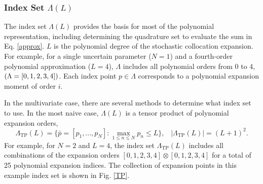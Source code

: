 \documentclass{mc2015}
\begin{document}
\subsubsection{Index Set $\Lambda(L)$}
The index set $\Lambda(L)$ provides the basis for most of the polynomial representation, including determining the quadrature set to evaluate the sum in Eq. \ref{approx}.  $L$ is the polynomial degree of the stochastic collocation expansion.  For example, for a single uncertain parameter ($N=1$) and a fourth-order polynomial approximation ($L=4$), $\Lambda$ includes all polynomial orders from 0 to 4, $\qty(\Lambda=[0,1,2,3,4])$.  Each index point $p\in\Lambda$ corresponds to a polynomial expansion moment of order $i$.

In the multivariate case, there are several methods to determine what index set to use.
In the most naive case, $\Lambda(L)$ is a tensor product of polynomial expansion orders,
\begin{equation}
\Lambda_\text{TP}(L)=\Big\{\bar p=[p_1,...,p_N]: \max_{1\leq n\leq N}p_n\leq L \Big\},\hspace{10pt}|\Lambda_\text{TP}(L)|=(L+1)^2.
\end{equation}
For example, for $N=2$ and $L=4$, the index set $\Lambda_\text{TP}(L)$ includes all combinations of the expansion orders $[0,1,2,3,4]\otimes[0,1,2,3,4]$ for a total of 25 polynomial expansion indices.  The collection of expansion points in this example index set is shown in Fig. \ref{TP}.  
\end{document}
